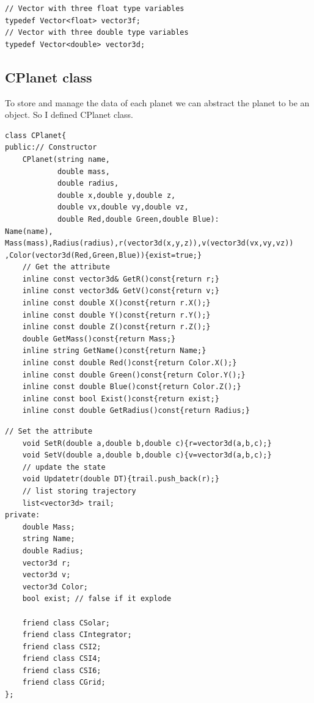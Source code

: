 \documentclass[12pt]{article}
\begin{document}
\begin{lstlisting}[caption=typedef]
// Vector with three float type variables
typedef Vector<float> vector3f;
// Vector with three double type variables
typedef Vector<double> vector3d;
\end{lstlisting}
\clearpage
\subsection{CPlanet class}
To store and manage the data of each planet we can abstract the planet to be an object.
So I defined CPlanet class.

\begin{lstlisting}[caption=CPlanet class I]
class CPlanet{
public:// Constructor
    CPlanet(string name, 
            double mass,
            double radius,
            double x,double y,double z,
            double vx,double vy,double vz,
            double Red,double Green,double Blue):
Name(name), Mass(mass),Radius(radius),r(vector3d(x,y,z)),v(vector3d(vx,vy,vz))
,Color(vector3d(Red,Green,Blue)){exist=true;}
    // Get the attribute
    inline const vector3d& GetR()const{return r;}
    inline const vector3d& GetV()const{return v;}
    inline const double X()const{return r.X();}
    inline const double Y()const{return r.Y();}
    inline const double Z()const{return r.Z();}
    double GetMass()const{return Mass;}
    inline string GetName()const{return Name;}
    inline const double Red()const{return Color.X();}
    inline const double Green()const{return Color.Y();}
    inline const double Blue()const{return Color.Z();}
    inline const bool Exist()const{return exist;}
    inline const double GetRadius()const{return Radius;}
\end{lstlisting}
\clearpage
\begin{lstlisting}[caption=CPlanet class II]
    // Set the attribute
    void SetR(double a,double b,double c){r=vector3d(a,b,c);}
    void SetV(double a,double b,double c){v=vector3d(a,b,c);}
    // update the state
    void Updatetr(double DT){trail.push_back(r);}
    // list storing trajectory
    list<vector3d> trail;
private:
    double Mass;
    string Name;
    double Radius;
    vector3d r;
    vector3d v;
    vector3d Color;
    bool exist; // false if it explode
    
    friend class CSolar;
    friend class CIntegrator;
    friend class CSI2;
    friend class CSI4;
    friend class CSI6;
    friend class CGrid;
};
\end{lstlisting}
\end{document}
